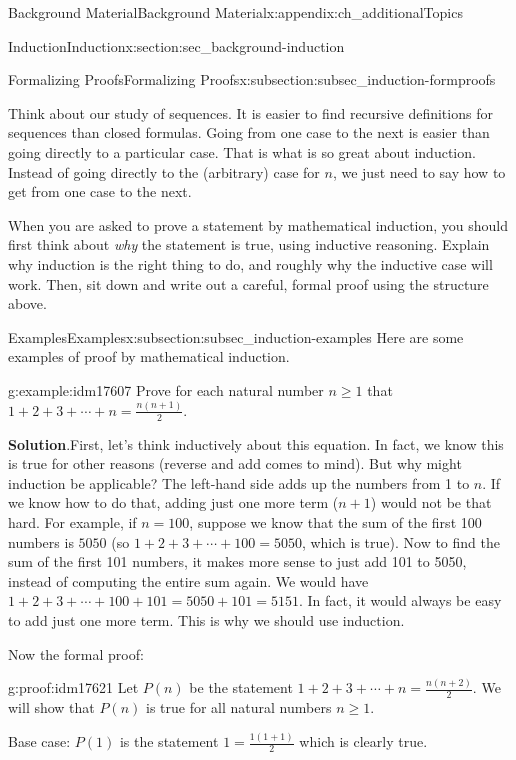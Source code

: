 \documentclass[oneside,10pt,]{book}
\numberwithin{equation}{chapter}
\begin{document}
\begin{appendixptx}{Background Material}{}{Background Material}{}{}{x:appendix:ch_additionalTopics}
\begin{sectionptx}{Induction}{}{Induction}{}{}{x:section:sec_background-induction}
\begin{subsectionptx}{Formalizing Proofs}{}{Formalizing Proofs}{}{}{x:subsection:subsec_induction-formproofs}
\par
Think about our study of sequences. It is easier to find recursive definitions for sequences than closed formulas. Going from one case to the next is easier than going directly to a particular case. That is what is so great about induction. Instead of going directly to the (arbitrary) case for \(n\), we just need to say how to get from one case to the next.%
\par
When you are asked to prove a statement by mathematical induction, you should first think about \emph{why} the statement is true, using inductive reasoning. Explain why induction is the right thing to do, and roughly why the inductive case will work. Then, sit down and write out a careful, formal proof using the structure above.%
\end{subsectionptx}
%
%
\typeout{************************************************}
\typeout{************************************************}
%
\begin{subsectionptx}{Examples}{}{Examples}{}{}{x:subsection:subsec_induction-examples}
Here are some examples of proof by mathematical induction.%
\begin{example}{}{g:example:idm17607}%
Prove for each natural number \(n \ge 1\) that \(1 + 2 + 3 + \cdots + n = \frac{n(n+1)}{2}\).%
\par\smallskip%
\noindent\textbf{Solution}.\hypertarget{g:solution:idm17612}{}\quad{}First, let's think inductively about this equation. In fact, we know this is true for other reasons (reverse and add comes to mind). But why might induction be applicable? The left-hand side adds up the numbers from 1 to \(n\). If we know how to do that, adding just one more term (\(n+1\)) would not be that hard. For example, if \(n = 100\), suppose we know that the sum of the first 100 numbers is \(5050\) (so \(1 + 2 + 3 + \cdots + 100 = 5050\), which is true). Now to find the sum of the first 101 numbers, it makes more sense to just add 101 to 5050, instead of computing the entire sum again. We would have \(1 + 2 + 3 + \cdots + 100 + 101 = 5050 + 101 = 5151\). In fact, it would always be easy to add just one more term. This is why we should use induction.%
\par
Now the formal proof:%
\begin{proofptx}{}{g:proof:idm17621}
Let \(P(n)\) be the statement \(1 + 2 + 3 + \cdots + n = \frac{n(n+2)}{2}\). We will show that \(P(n)\) is true for all natural numbers \(n \ge 1\).%
\par
Base case: \(P(1)\) is the statement \(1 = \frac{1(1+1)}{2}\) which is clearly true.%

\end{proofptx}
\end{example}
\end{subsectionptx}
\end{sectionptx}
\end{appendixptx}
\end{document}
